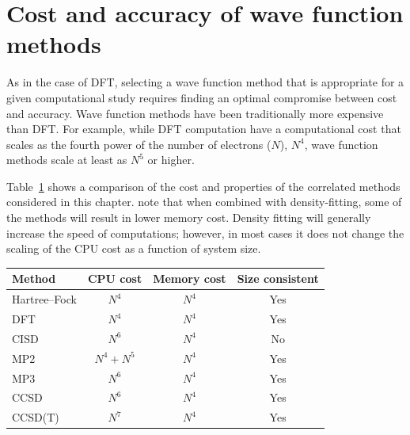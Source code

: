\documentclass[../Main/chem371-notes.tex]{subfiles}
\begin{document}
\section{Cost and accuracy of wave function methods}

As in the case of DFT, selecting a wave function method that is appropriate for a given computational study requires finding an optimal compromise between cost and accuracy.
Wave function methods have been traditionally more expensive than DFT.
For example, while DFT computation have a computational cost that scales as the fourth power of the number of electrons ($N$), $N^4$, wave function methods scale at least as $N^5$ or higher.

Table~\ref{tab:wfn:comparison} shows a comparison of the cost and properties of the correlated methods considered in this chapter.
note that when combined with density-fitting, some of the methods will result in lower memory cost.
Density fitting will generally increase the speed of computations; however, in most cases it does not change the scaling of the CPU cost as a function of system size.
\begin{table}[htbp]
\centering
{} %
\begin{tabular}{@{} lccc @{}}
\toprule
Method & CPU cost & Memory cost & Size consistent\\
\midrule
Hartree--Fock & $N^4$ &  $N^4$ & Yes \\
DFT & $N^4$ & $N^4$ & Yes \\
CISD & $N^6$ & $N^4$ & No\\
MP2 & $N^4 + N^5$ & $N^4$ & Yes\\
MP3 & $N^6$ & $N^4$ & Yes \\
CCSD & $N^6$ &$ N^4$ & Yes\\
CCSD(T) & $N^7$ & $N^4$ &Yes\\
\bottomrule
\end{tabular}
\label{tab:wfn:comparison}
\end{table}
\end{document}
